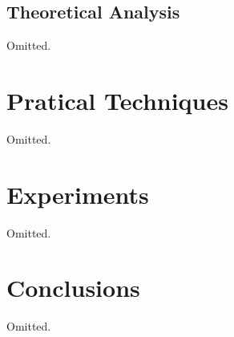 \documentclass[conference]{IEEEtran}
\begin{document}
\subsection{Theoretical Analysis}

Omitted.

\section{Pratical Techniques}

Omitted.

\section{Experiments}

Omitted.

\section{Conclusions}

Omitted.

\end{document}
